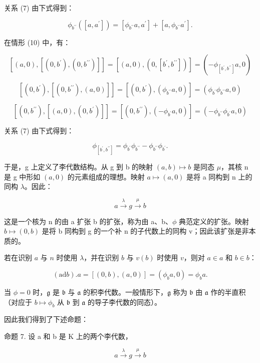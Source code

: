 关系 (7) 由下式得到：

\[
\phi_ {b ^ {\prime \prime}} ([ a, a ^ {\prime} ]) = [ \phi_ {b ^ {\prime \prime}} a, a ^ {\prime} ] + [ a, \phi_ {b ^ {\prime \prime}} a ^ {\prime} ].
\]

在情形 (10) 中，有：

\[
[ (a, 0), [ (0, b ^ {\prime}), (0, b ^ {\prime \prime}) ] ] = [ (a, 0), (0, [ b ^ {\prime}, b ^ {\prime \prime} ]) ] = (- \phi_ {[ b ^ {\prime}, b ^ {\prime \prime} ]} a, 0)
\]

\[
[ (0, b ^ {\prime}), [ (0, b ^ {\prime \prime}), (a, 0) ] ] = [ (0, b ^ {\prime}), (\phi_ {b ^ {\prime \prime}} a, 0) ] = (\phi_ {b ^ {\prime}} \phi_ {b ^ {\prime \prime}} a, 0)
\]

\[
[ (0, b ^ {\prime \prime}), [ (a, 0), (0, b ^ {\prime}) ] ] = [ (0, b ^ {\prime \prime}), (- \phi_ {b ^ {\prime}} a, 0) ] = (- \phi_ {b ^ {\prime \prime}} \phi_ {b ^ {\prime}} a, 0)
\]

关系 (7) 由下式得到：

\[
\phi_ {[ b ^ {\prime}, b ^ {\prime \prime} ]} = \phi_ {b ^ {\prime}} \phi_ {b ^ {\prime \prime}} - \phi_ {b ^ {\prime \prime}} \phi_ {b ^ {\prime}}.
\]

于是，g 上定义了李代数结构。从 g 到 b 的映射 \((a, b) \mapsto b\) 是同态 \(\mu\)，其核 n 是 g 中形如 \((a, 0)\) 的元素组成的理想。映射 \(a \mapsto (a, 0)\) 是将 a 同构到 n 上的同构 \(\lambda\)。因此：

\[
a \xrightarrow {\lambda} g \xrightarrow {\mu} b\tag{12}
\]

这是一个核为 n 的由 a 扩张 b 的扩张，称为由 a、b、\(\phi\) 典范定义的扩张。映射 \(b \mapsto (0, b)\) 是将 b 同构到 g 的一个补 n 的子代数上的同构 v；因此该扩张是非本质的。

若在识别 \(a\) 与 \(n\) 时使用 \(\lambda\)，并在识别 \(b\) 与 \(v(b)\) 时使用 \(v\)，则对 \(a \in a\) 和 \(b \in b\)：

\[
(\mathrm{ad} b). a = [ (0, b), (a, 0) ] = (\phi_ {b} a, 0) = \phi_ {b} a.
\]

当 \(\phi = 0\) 时，\(\mathfrak{g}\) 是 \(\mathfrak{b}\) 与 \(\mathfrak{a}\) 的积李代数。一般情形下，\(\mathfrak{g}\) 称为 \(\mathfrak{b}\) 由 \(\mathfrak{a}\) 作的半直积（对应于 \(b \mapsto \phi_b\) 从 \(\mathfrak{b}\) 到 \(\mathfrak{a}\) 的导子李代数的同态）。

因此我们得到了下述命题：

命题 7. 设 a 和 b 是 K 上的两个李代数，

\[
a \xrightarrow {\lambda} g \xrightarrow {\mu} b
\]

